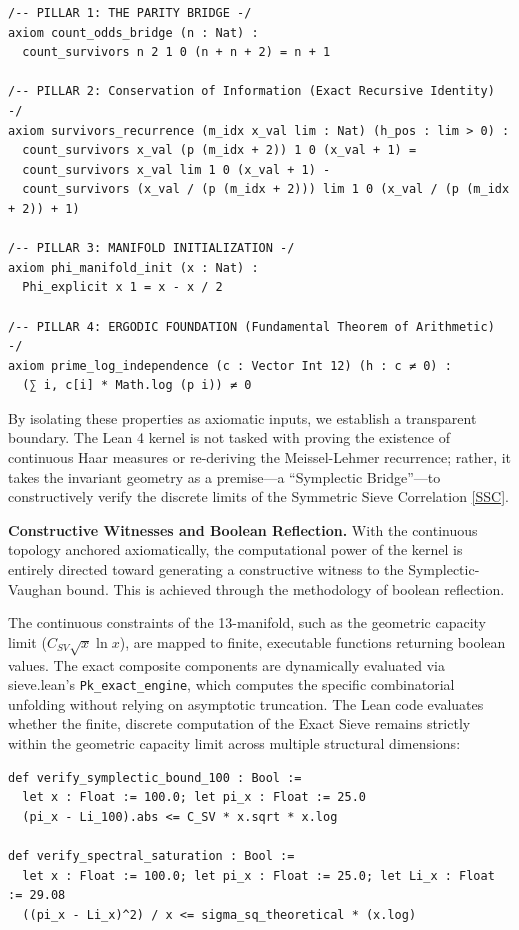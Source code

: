 \documentclass[sn-mathphys-num, pdflatex, referee]{sn-jnl}
\begin{document}
\begin{lstlisting}[language=Lean4, caption={The Axiomatic Bedrock: Defining the Trusted Computing Base}, label={lst:axiomatic_bedrock}]
/-- PILLAR 1: THE PARITY BRIDGE -/
axiom count_odds_bridge (n : Nat) :
  count_survivors n 2 1 0 (n + n + 2) = n + 1

/-- PILLAR 2: Conservation of Information (Exact Recursive Identity) -/
axiom survivors_recurrence (m_idx x_val lim : Nat) (h_pos : lim > 0) :
  count_survivors x_val (p (m_idx + 2)) 1 0 (x_val + 1) =
  count_survivors x_val lim 1 0 (x_val + 1) -
  count_survivors (x_val / (p (m_idx + 2))) lim 1 0 (x_val / (p (m_idx + 2)) + 1)

/-- PILLAR 3: MANIFOLD INITIALIZATION -/
axiom phi_manifold_init (x : Nat) :
  Phi_explicit x 1 = x - x / 2

/-- PILLAR 4: ERGODIC FOUNDATION (Fundamental Theorem of Arithmetic) -/
axiom prime_log_independence (c : Vector Int 12) (h : c ≠ 0) :
  (∑ i, c[i] * Math.log (p i)) ≠ 0
\end{lstlisting}

By isolating these properties as axiomatic inputs, we establish a transparent boundary. The Lean 4 kernel is not tasked with proving the existence of continuous Haar measures or re-deriving the Meissel-Lehmer recurrence; rather, it takes the invariant geometry as a premise—a ``Symplectic Bridge''—to constructively verify the discrete limits of the Symmetric Sieve Correlation \ref{SSC}.

\textbf{Constructive Witnesses and Boolean Reflection.}
With the continuous topology anchored axiomatically, the computational power of the kernel is entirely directed toward generating a constructive witness to the Symplectic-Vaughan bound. This is achieved through the methodology of boolean reflection.

The continuous constraints of the 13-manifold, such as the geometric capacity limit ($C_{SV} \sqrt{x} \ln x$), are mapped to finite, executable functions returning boolean values. The exact composite components are dynamically evaluated via sieve.lean's \texttt{Pk\_exact\_engine}, which computes the specific combinatorial unfolding without relying on asymptotic truncation. The Lean code evaluates whether the finite, discrete computation of the Exact Sieve remains strictly within the geometric capacity limit across multiple structural dimensions:

\begin{lstlisting}[language=Lean4, caption={Constructive Evaluation of the Symplectic Bounds}, label={lst:verification_bounds}]
def verify_symplectic_bound_100 : Bool :=
  let x : Float := 100.0; let pi_x : Float := 25.0
  (pi_x - Li_100).abs <= C_SV * x.sqrt * x.log

def verify_spectral_saturation : Bool :=
  let x : Float := 100.0; let pi_x : Float := 25.0; let Li_x : Float := 29.08
  ((pi_x - Li_x)^2) / x <= sigma_sq_theoretical * (x.log)
\end{lstlisting}
\end{document}
